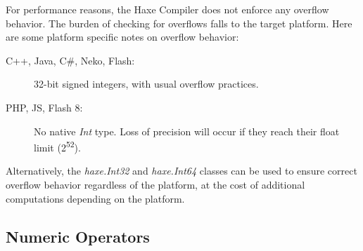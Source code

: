 \documentclass{haxe}
\begin{document}
For performance reasons, the Haxe Compiler does not enforce any overflow behavior.  The burden of checking for overflows falls to the target platform. Here are some platform specific notes on overflow behavior:

\begin{description}
 \item[C++, Java, C\#, Neko, Flash:] 32-bit signed integers, with usual overflow practices. 
 \item[PHP, JS, Flash 8:] No native \emph{Int} type.  Loss of precision will occur if they reach their float limit (2\textsuperscript{52}).
\end{description}

Alternatively, the \emph{haxe.Int32} and \emph{haxe.Int64} classes can be used to ensure correct overflow behavior regardless of the platform, at the cost of additional computations depending on the platform.

\subsection{Numeric Operators}
\label{types-numeric-operators}

\end{document}
